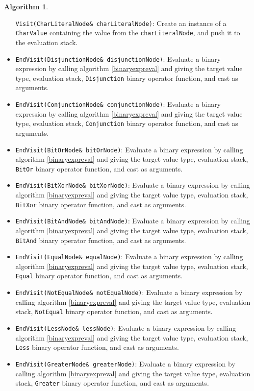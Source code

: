 \documentclass[a4paper,oneside,11pt]{book}
\theoremstyle{definition}
\newtheorem{algo}{Algorithm}[section]
\begin{document}
\begin{algo}
\begin{itemize}
\verb|Visit(CharLiteralNode& charLiteralNode)|:
Create an instance of a \verb|CharValue| containing the value from the \verb|charLiteralNode|, and push it to the evaluation stack.
\item
\verb|EndVisit(DisjunctionNode& disjunctionNode)|:
Evaluate a binary expression by calling algorithm \ref{binaryexpreval}
and giving the target value type, evaluation stack, \verb|Disjunction| binary operator function, and cast as arguments.
\item
\verb|EndVisit(ConjunctionNode& conjunctionNode)|:
Evaluate a binary expression by calling algorithm \ref{binaryexpreval}
and giving the target value type, evaluation stack, \verb|Conjunction| binary operator function, and cast as arguments.
\item
\verb|EndVisit(BitOrNode& bitOrNode)|:
Evaluate a binary expression by calling algorithm \ref{binaryexpreval}
and giving the target value type, evaluation stack, \verb|BitOr| binary operator function, and cast as arguments.
\item
\verb|EndVisit(BitXorNode& bitXorNode)|:
Evaluate a binary expression by calling algorithm \ref{binaryexpreval}
and giving the target value type, evaluation stack, \verb|BitXor| binary operator function, and cast as arguments.
\item
\verb|EndVisit(BitAndNode& bitAndNode)|:
Evaluate a binary expression by calling algorithm \ref{binaryexpreval}
and giving the target value type, evaluation stack, \verb|BitAnd| binary operator function, and cast as arguments.
\item
\verb|EndVisit(EqualNode& equalNode)|:
Evaluate a binary expression by calling algorithm \ref{binaryexpreval}
and giving the target value type, evaluation stack, \verb|Equal| binary operator function, and cast as arguments.
\item
\verb|EndVisit(NotEqualNode& notEqualNode)|:
Evaluate a binary expression by calling algorithm \ref{binaryexpreval}
and giving the target value type, evaluation stack, \verb|NotEqual| binary operator function, and cast as arguments.
\item
\verb|EndVisit(LessNode& lessNode)|:
Evaluate a binary expression by calling algorithm \ref{binaryexpreval}
and giving the target value type, evaluation stack, \verb|Less| binary operator function, and cast as arguments.
\item
\verb|EndVisit(GreaterNode& greaterNode)|:
Evaluate a binary expression by calling algorithm \ref{binaryexpreval}
and giving the target value type, evaluation stack, \verb|Greater| binary operator function, and cast as arguments.

\end{itemize}
\end{algo}
\end{document}
